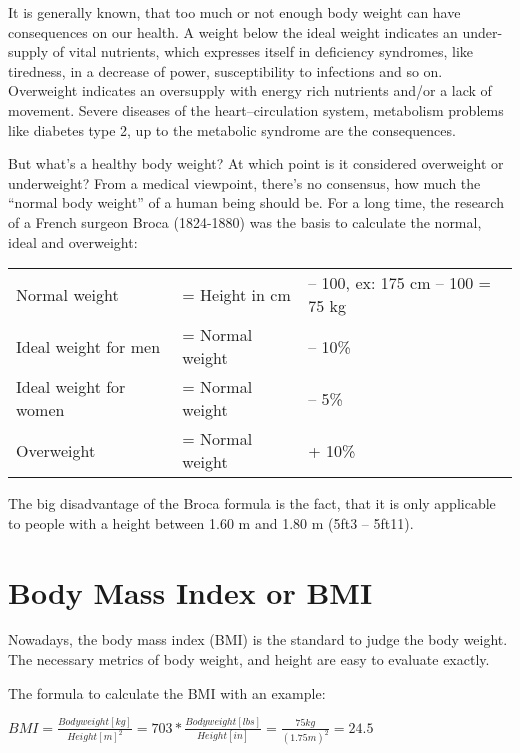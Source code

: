 \documentclass[../main.tex]{subfiles}
\begin{document}
It is generally known, that too much or not enough body weight can have consequences on our health.
A weight below the ideal weight indicates an under-supply of vital nutrients, which expresses itself in deficiency syndromes,
like tiredness, in a decrease of power, susceptibility to infections and so on.
Overweight indicates an oversupply with energy rich nutrients and/or a lack of movement.
Severe diseases of the heart--circulation system, metabolism problems like diabetes type 2, up to the metabolic syndrome are the consequences.

But what's a healthy body weight? At which point is it considered overweight or underweight?
From a medical viewpoint, there's no consensus, how much the ``normal body weight'' of a human being should be.
For  a long time, the research of a French surgeon Broca (1824-1880) was the basis to calculate the normal, ideal and overweight:

\noindent
\begin{tabular}{lll}
  Normal weight & = Height in cm &-- 100, ex: 175 cm -- 100 = 75 kg \\
  Ideal weight for men & = Normal weight &-- 10\% \\
  Ideal weight for women & = Normal weight &-- 5\% \\
  Overweight & = Normal weight &+ 10\% \\
\end{tabular}

The big disadvantage of the Broca formula is the fact, that it is only applicable to people with a height between 1.60 m and 1.80 m (5ft3 -- 5ft11).

\section{Body Mass Index or BMI}

Nowadays, the body mass index (BMI) is the standard to judge the body weight.
The necessary metrics of body weight, and height are easy to evaluate exactly.

The formula to calculate the BMI with an example:

\vspace{2mm}
\begin{center}
  \begin{fminipage}{10cm}
  $BMI = \frac{Body weight [kg]}{Height [m]^2} = 703 * \frac{Body weight [lbs]}{Height [in]}
  = \frac{75 kg}{(1.75 m)^2} = 24.5$
  \end{fminipage}
\end{center}
\end{document}
